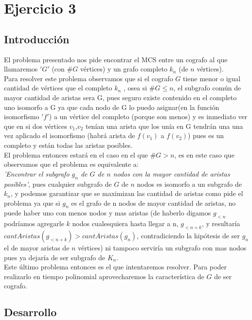\section{Ejercicio 3}

\subsection{Introducción}
\noindent El problema presentado nos pide encontrar el MCS entre un cografo al que llamaremos $'G'$ (con $\#G$ vértices) y un grafo completo $k_n$ (de $n$ vértices).\\
Para resolver este problema observamos que si el cografo $G$ tiene menor o igual cantidad de vértices que el completo $k_n$ , osea si $\#G \leq n$, el subgrafo común de mayor cantidad de aristas sera  G, pues seguro existe contenido en el completo uno isomorfo a G ya que cada nodo de G lo puedo asignar(en la función isomorfismo $'f'$) a un vértice del completo (porque son menos) y es inmediato ver que en si dos vértices $v_1$,$v_2$ tenían una arista que los unía en G tendrán una una vez aplicado el isomorfismo (habrá arista de $f(v_1)$ a $f(v_2)$) pues es un completo y están todas las aristas posibles.\\
El problema entonces estará en el caso en el que $\#G > n$, es en este caso que observamos que el problema es equivalente a:\\
\emph{'Encontrar el subgrafo $g_n$ de $G$ de $n$ nodos con la mayor cantidad de aristas posibles'}, pues cualquier subgrafo de $G$ de $n$ nodos es isomorfo a un subgrafo de $k_n$, y podemos garantizar que se maximizan las cantidad de aristas como pide el problema ya que si $g_n$ es el grafo de n nodos de mayor cantidad de aristas, no puede haber uno con menos nodos y mas aristas (de haberlo digamos $g_{<n}$ podríamos agregarle $k$ nodos cualesquiera hasta llegar a n, $g_{<n+k}$, y resultaría $cantAristas(g_{<n+k})>cantAristas(g_n)$, contradiciendo la hipótesis de ser $g_n$ el de mayor aristas de $n$ vértices) ni tampoco serviría un subgrafo con mas nodos pues ya dejaría de ser subgrafo de $K_n$.\\
Este último problema entonces es el que intentaremos resolver. Para poder realizarlo en tiempo polinomial aprovecharemos la característica de $G$ de ser cografo.

\subsection{Desarrollo}

